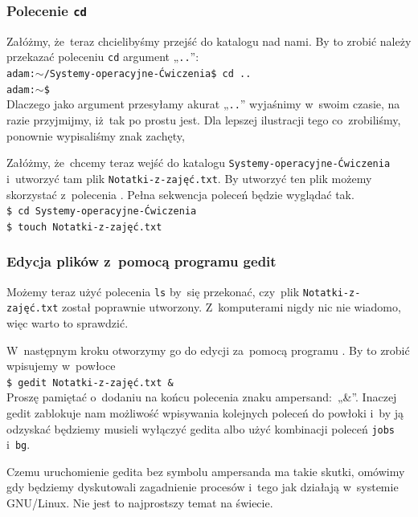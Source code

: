 \documentclass[10pt,t]{beamer}
\begin{document}
\begin{frame}
  \frametitle{Polecenie \texttt{cd}}


  Załóżmy, że~teraz chcielibyśmy przejść do katalogu nad nami. By to zrobić
  należy przekazać poleceniu \texttt{cd} argument „\texttt{..}”: \\
  \texttt{adam:$\sim$/Systemy-operacyjne-Ćwiczenia\$ cd ..} \\
  \texttt{adam:$\sim$\$} \\
  Dlaczego jako argument przesyłamy akurat „\texttt{..}” wyjaśnimy w~swoim
  czasie, na razie przyjmijmy, iż~tak po prostu jest. Dla lepszej
  ilustracji tego co~zrobiliśmy, ponownie wypisaliśmy znak zachęty,

  Załóżmy, że~chcemy teraz wejść do katalogu
  \texttt{Systemy-operacyjne-Ćwiczenia} i~utworzyć tam plik
  \texttt{Notatki-z-zajęć.txt}. By utworzyć ten plik możemy skorzystać
  z~polecenia
  . Pełna
  sekwencja poleceń będzie wyglądać tak. \\
  \texttt{\$ cd Systemy-operacyjne-Ćwiczenia} \\
  \texttt{\$ touch Notatki-z-zajęć.txt} \\

\end{frame}





\begin{frame}
  \frametitle{Edycja plików z~pomocą programu gedit}


  Możemy teraz użyć polecenia \texttt{ls} by~się przekonać, czy~plik
  \texttt{Notatki-z-zajęć.txt} został poprawnie utworzony.
  Z~komputerami nigdy nic nie wiadomo, więc warto to sprawdzić.

  W~następnym kroku otworzymy go do edycji za~pomocą programu
  . By to zrobić
  wpisujemy w~powłoce \\
  \texttt{\$ gedit Notatki-z-zajęć.txt \&} \\
  Proszę pamiętać o~dodaniu na końcu polecenia znaku
  \alert{ampersand}:~„\&”. Inaczej gedit zablokuje nam możliwość wpisywania
  kolejnych poleceń do powłoki i~by ją odzyskać będziemy musieli
  wyłączyć gedita albo użyć kombinacji poleceń \texttt{jobs} i~\texttt{bg}.

  Czemu uruchomienie gedita bez symbolu ampersanda ma takie skutki, omówimy
  gdy będziemy dyskutowali zagadnienie procesów i~tego jak działają
  w~systemie GNU/Linux. Nie jest to najprostszy temat na świecie.

\end{frame}
\end{document}
